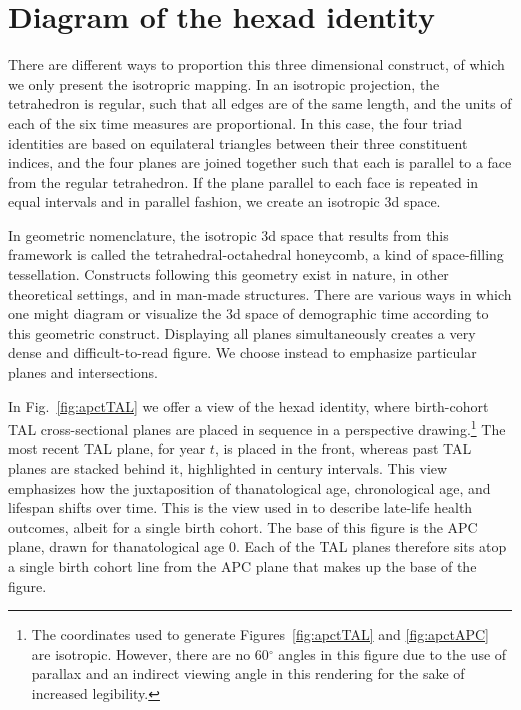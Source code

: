 \documentclass[11pt,oneside,a4paper]{article} %
\begin{document}
 \section*{Diagram of the hexad identity}
 There are different ways to proportion this three dimensional construct,
of which we only present the isotropric mapping. In an isotropic projection, the
tetrahedron is regular, such that all edges are of the same length, and the
units of each of the six time measures are proportional. In this case, the four triad identities are based on equilateral triangles between their three constituent indices, and the four planes are joined together such that each is parallel to a face from the regular
tetrahedron. If the plane parallel to each face is repeated in equal
intervals and in parallel fashion, we create an isotropic 3d space.

In geometric nomenclature, the isotropic 3d space that results from this
framework is called the tetrahedral-octahedral honeycomb, a kind of
space-filling tessellation. Constructs following this geometry exist in nature, in other
theoretical settings, and in man-made structures. There are
various ways in which one might diagram or visualize the 3d space of demographic
time according to this geometric construct. Displaying all planes simultaneously
creates a very dense and difficult-to-read figure. We choose instead to
emphasize particular planes and intersections. 

In Fig.~\ref{fig:apctTAL} we
offer a view of the hexad identity, where birth-cohort TAL cross-sectional
planes are placed in sequence in a perspective drawing.\footnote{The coordinates
used to generate Figures~\ref{fig:apctTAL} and \ref{fig:apctAPC} are isotropic.
However, there are no 60$^\circ$ angles in this figure due to the use of parallax and an indirect viewing angle in this rendering for the sake of increased legibility.} The most recent TAL plane, for year $t$, is placed in the front, whereas past TAL planes are stacked behind it, highlighted in century intervals.
This view emphasizes how the juxtaposition of thanatological age,
chronological age, and lifespan shifts over time. This is the view used in
\citet{riffe2015ttd} to describe late-life health outcomes, albeit for a single
birth cohort.
The base of this figure is the APC plane, drawn for thanatological age 0. Each
of the TAL planes therefore sits atop a single birth cohort line from the APC plane that makes up the base of the
figure. 
\end{document}
